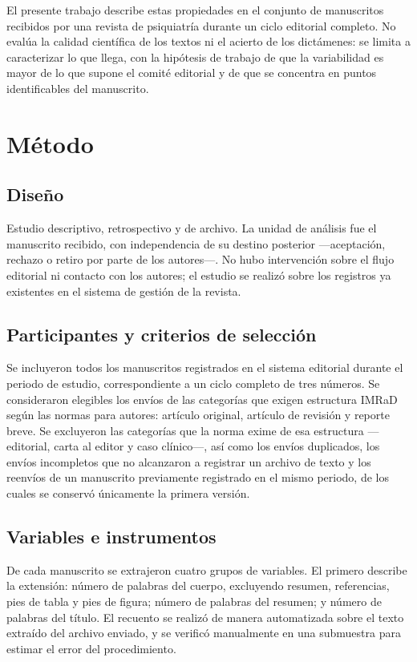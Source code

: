 \documentclass{apm-editorial}
\begin{document}
El presente trabajo describe estas propiedades en el conjunto de
manuscritos recibidos por una revista de psiquiatría durante un ciclo
editorial completo. No evalúa la calidad científica de los textos ni el
acierto de los dictámenes: se limita a caracterizar lo que llega, con
la hipótesis de trabajo de que la variabilidad es mayor de lo que
supone el comité editorial y de que se concentra en puntos
identificables del manuscrito.

\section*{Método}

\subsection*{Diseño}

Estudio descriptivo, retrospectivo y de archivo. La unidad de análisis
fue el manuscrito recibido, con independencia de su destino posterior
—aceptación, rechazo o retiro por parte de los autores—. No hubo
intervención sobre el flujo editorial ni contacto con los autores; el
estudio se realizó sobre los registros ya existentes en el sistema de
gestión de la revista.

\subsection*{Participantes y criterios de selección}

Se incluyeron todos los manuscritos registrados en el sistema editorial
durante el periodo de estudio, correspondiente a un ciclo completo de
tres números. Se consideraron elegibles los envíos de las categorías
que exigen estructura IMRaD según las normas para autores: artículo
original, artículo de revisión y reporte breve. Se excluyeron las
categorías que la norma exime de esa estructura —editorial, carta al
editor y caso clínico—, así como los envíos duplicados, los envíos
incompletos que no alcanzaron a registrar un archivo de texto y los
reenvíos de un manuscrito previamente registrado en el mismo periodo,
de los cuales se conservó únicamente la primera versión.

\subsection*{Variables e instrumentos}

De cada manuscrito se extrajeron cuatro grupos de variables. El primero
describe la extensión: número de palabras del cuerpo, excluyendo
resumen, referencias, pies de tabla y pies de figura; número de
palabras del resumen; y número de palabras del título. El recuento se
realizó de manera automatizada sobre el texto extraído del archivo
enviado, y se verificó manualmente en una submuestra para estimar el
error del procedimiento.
\end{document}
